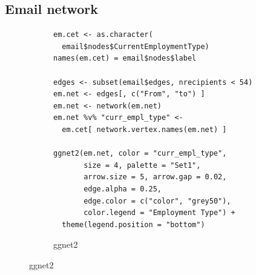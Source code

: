 \subsection{Email network} %

\begin{figure}[hbt]
\begin{subfigure}[t]{\textwidth}
\caption{ggnet2}
\vspace{1em}

             \begin{adjustbox}{valign=t}

             \begin{minipage}{.49\textwidth}
 \begin{knitrout}\footnotesize
{}\color{fgcolor}\begin{kframe}
\begin{verbatim}
em.cet <- as.character(
  email$nodes$CurrentEmploymentType)
names(em.cet) = email$nodes$label

edges <- subset(email$edges, nrecipients < 54)
em.net <- edges[, c("From", "to") ]
em.net <- network(em.net)
em.net %v% "curr_empl_type" <-
  em.cet[ network.vertex.names(em.net) ]

ggnet2(em.net, color = "curr_empl_type",
       size = 4, palette = "Set1",
       arrow.size = 5, arrow.gap = 0.02,
       edge.alpha = 0.25,
       edge.color = c("color", "grey50"),
       color.legend = "Employment Type") +
  theme(legend.position = "bottom")
\end{verbatim}
\end{kframe}
\end{knitrout} \vspace{1em}

                   \end{minipage}

                  \begin{minipage}{.49\textwidth}


\end{minipage}
\end{adjustbox}
\end{subfigure}
\end{figure}
